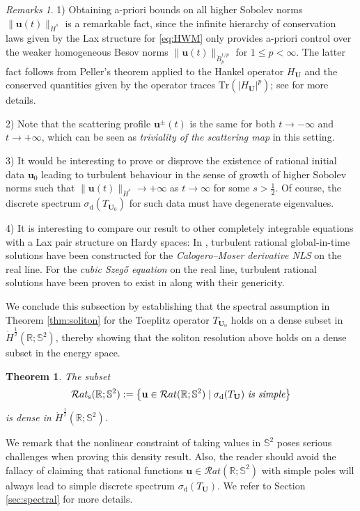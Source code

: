 \documentclass[11pt,reqno]{amsart}
\newtheorem{thm}{Theorem}[section]
\theoremstyle{definition}
\theoremstyle{remark}
\theoremstyle{remark}
\newtheorem*{remarks*}{Remarks}
\numberwithin{equation}{section}
\newcommand{\R}{\mathbb{R}}
\newcommand{\Ss}{\mathbb{S}}
\newcommand{\uu}{\mathbf{u}}
\newcommand{\Ub}{\mathbf{U}}
\newcommand{\Tr}{\mathrm{Tr}}
\begin{document}
\begin{remarks*}
1) Obtaining a-priori bounds on all higher Sobolev norms $\| \uu(t) \|_{\dot{H}^s}$ is a remarkable fact, since the infinite hierarchy of conservation laws given by the Lax structure for \eqref{eq:HWM} only provides a-priori control over the weaker homogeneous Besov norms $\| \uu(t) \|_{\dot{B}^{1/p}_{p}}$ for $1 \leq p < \infty$. The latter fact follows from Peller's theorem applied to the Hankel operator $H_{\Ub}$ and the conserved quantities given by the operator traces $\Tr(|H_{\Ub}|^p)$; see  \cite{GeLe-18} for more details.

2) Note that the scattering profile $\uu^{\pm}(t)$ is the same for both $t \to -\infty$ and $t \to +\infty$, which can be seen as {\em triviality of the scattering map} in this setting.

3) It would be interesting to prove or disprove the existence of rational initial data $\uu_0$ leading to turbulent behaviour in the sense of growth of higher Sobolev norms such that $\| \uu(t) \|_{\dot{H}^s} \to +\infty$ as $t \to \infty$ for some $s > \frac 1 2$. Of course, the discrete spectrum $\sigma_{\mathrm{d}}(T_{\Ub_0})$ for such data must have degenerate eigenvalues. 

4) It is interesting to compare our result to other completely integrable equations with a Lax pair structure on Hardy spaces: In \cite{GeLe-24}, turbulent rational global-in-time solutions have been constructed for the {\em Calogero--Moser derivative NLS} on the real line. For the {\em cubic Szeg\H{o} equation} on the real line, turbulent rational solutions have been proven to exist in \cite{GePu-24b} along with their genericity. 
\end{remarks*}

We conclude this subsection by establishing that the spectral assumption in Theorem \ref{thm:soliton} for the Toeplitz operator $T_{\Ub_0}$ holds on a dense subset in  $\dot{H}^{\frac 1 2}(\R; \Ss^2)$, thereby showing that the soliton resolution above holds on a dense subset in the energy space.

\begin{thm} \label{thm:generic}
The subset
$$
\mathcal{R}at_{\mathrm{s}}(\R;\Ss^2) := \left \{ \uu \in \mathcal{R}at(\R; \Ss^2) \mid \mbox{$\sigma_{\mathrm{d}}(T_{\Ub})$ {\em is simple}} \right \}
$$
is dense in $\dot{H}^{\frac 1 2}(\R; \Ss^2)$.
\end{thm} 

We remark that the nonlinear constraint of taking values in $\Ss^2$ poses serious challenges when proving this density result. Also, the reader should avoid the fallacy of claiming that rational functions $\uu \in \mathcal{R}at(\R; \Ss^2)$ with simple poles will always lead to simple discrete spectrum $\sigma_{\mathrm{d}}(T_\Ub)$. We refer to Section \ref{sec:spectral} for more details.
\end{document}
